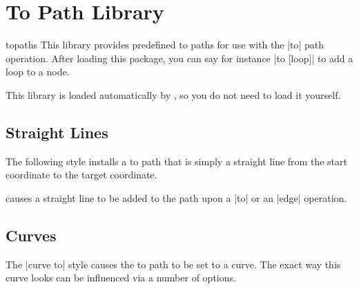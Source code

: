 %
%
%

\section{To Path Library}

\label{library-to-paths}

\begin{tikzlibrary}{topaths}
  This library provides predefined to paths for use with the |to|
  path operation. After loading this package, you can say for instance
  |to [loop]| to add a loop to a node.

  This library is loaded automatically by \tikzname, so you do not
  need to load it yourself.
\end{tikzlibrary}


\subsection{Straight Lines}

The following style installs a to path that is simply a straight line
from the start coordinate to the target coordinate.

\begin{itemize}
  causes a straight line to be added to the path upon a |to| or an
  |edge| operation.
\begin{codeexample}[]
\end{codeexample}
\end{itemize}


\subsection{Curves}

The |curve to| style causes the to path to be set to a curve. The
exact way this curve looks can be influenced via a number of options.


